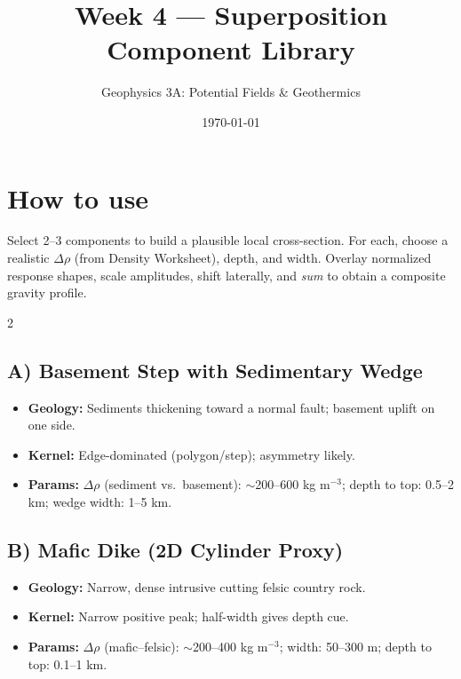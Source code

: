 \documentclass[11pt,a4paper]{article}
\title{Week 4 --- Superposition Component Library}
\author{Geophysics 3A: Potential Fields \& Geothermics}
\date{\today}
\begin{document}
\maketitle
\vspace{-1em}

\section*{How to use}
Select 2--3 components to build a plausible local cross-section. For each, choose a realistic $\Delta\rho$ (from Density Worksheet), depth, and width. Overlay normalized response shapes, scale amplitudes, shift laterally, and \emph{sum} to obtain a composite gravity profile.

\begin{multicols}{2}
\subsection*{A) Basement Step with Sedimentary Wedge}
\begin{itemize}
  \item \textbf{Geology:} Sediments thickening toward a normal fault; basement uplift on one side.
  \item \textbf{Kernel:} Edge-dominated (polygon/step); asymmetry likely.
  \item \textbf{Params:} $\Delta\rho$ (sediment vs.\ basement): $\sim$200--600 kg m$^{-3}$; depth to top: 0.5--2 km; wedge width: 1--5 km.
\end{itemize}
\begin{center}
\end{center}

\subsection*{B) Mafic Dike (2D Cylinder Proxy)}
\begin{itemize}
  \item \textbf{Geology:} Narrow, dense intrusive cutting felsic country rock.
  \item \textbf{Kernel:} Narrow positive peak; half-width gives depth cue.
  \item \textbf{Params:} $\Delta\rho$ (mafic--felsic): $\sim$200--400 kg m$^{-3}$; width: 50--300 m; depth to top: 0.1--1 km.
\end{itemize}
\begin{center}
\end{center}


\end{multicols}
\end{document}
